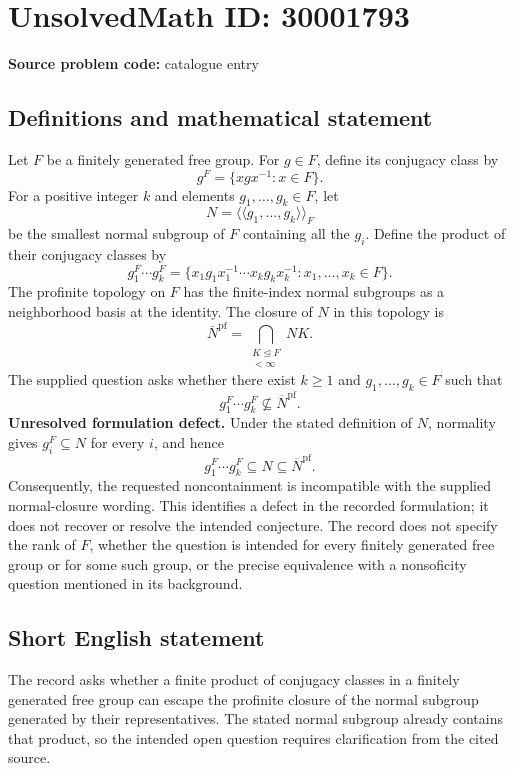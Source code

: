 \documentclass[11pt]{article}
\begin{document}
\section*{UnsolvedMath ID: 30001793}
\textbf{Source problem code:} catalogue entry
\subsection{Definitions and mathematical statement}
Let \(F\) be a finitely generated free group. For \(g\in F\), define its conjugacy class by
\[
g^F=\{xgx^{-1}:x\in F\}.
\]
For a positive integer \(k\) and elements \(g_1,\ldots,g_k\in F\), let
\[
N=\langle\!\langle g_1,\ldots,g_k\rangle\!\rangle_F
\]
be the smallest normal subgroup of \(F\) containing all the \(g_i\). Define the product of their conjugacy classes by
\[
g_1^F\cdots g_k^F
=\{x_1g_1x_1^{-1}\cdots x_kg_kx_k^{-1}:x_1,\ldots,x_k\in F\}.
\]
The profinite topology on \(F\) has the finite-index normal subgroups as a neighborhood basis at the identity. The closure of \(N\) in this topology is
\[
\overline N^{\mathrm{pf}}
=\bigcap_{\substack{K\trianglelefteq F\\[F:K]<\infty}}NK.
\]
The supplied question asks whether there exist \(k\geq 1\) and \(g_1,\ldots,g_k\in F\) such that
\[
g_1^F\cdots g_k^F\not\subseteq\overline N^{\mathrm{pf}}.
\]
\textbf{Unresolved formulation defect.} Under the stated definition of \(N\), normality gives \(g_i^F\subseteq N\) for every \(i\), and hence
\[
g_1^F\cdots g_k^F\subseteq N\subseteq\overline N^{\mathrm{pf}}.
\]
Consequently, the requested noncontainment is incompatible with the supplied normal-closure wording. This identifies a defect in the recorded formulation; it does not recover or resolve the intended conjecture. The record does not specify the rank of \(F\), whether the question is intended for every finitely generated free group or for some such group, or the precise equivalence with a nonsoficity question mentioned in its background.
\subsection{Short English statement}
The record asks whether a finite product of conjugacy classes in a finitely generated free group can escape the profinite closure of the normal subgroup generated by their representatives. The stated normal subgroup already contains that product, so the intended open question requires clarification from the cited source.
\end{document}
